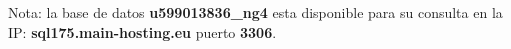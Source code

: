 Nota: la base de datos \textbf{u599013836\_ng4} esta disponible para su consulta en la IP: \textbf{sql175.main-hosting.eu} puerto \textbf{3306}. 

